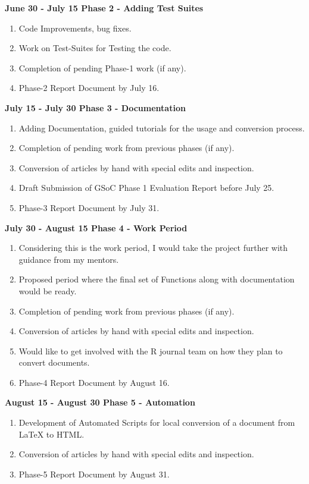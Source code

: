 \documentclass[12pt]{article}
\begin{document}
{\large\bfseries {\color{orange}June 30 - July 15} Phase 2 - Adding Test Suites}
\begin{enumerate}[label = {  \color{MediumBlue} \textbf{\arabic*. }},align=left]
\item Code Improvements, bug fixes.
\item Work on Test-Suites for Testing the code.
\item Completion of pending Phase-1 work (if any).
\item Phase-2 Report Document by July 16.
\end{enumerate}
{\large\bfseries {\color{orange}July 15 - July 30} Phase 3 - Documentation}
\begin{enumerate}[label = {  \color{MediumBlue} \textbf{\arabic*. }},align=left]
\item Adding Documentation, guided tutorials for the usage and conversion process.
\item Completion of pending work from previous phases (if any).
\item Conversion of articles by hand with special edits and inspection.
\item Draft Submission of GSoC Phase 1 Evaluation Report before July 25.
\item Phase-3 Report Document by July 31.
\end{enumerate}
{\large\bfseries {\color{orange}July 30 - August 15} Phase 4 - Work Period}
\begin{enumerate}[label = {  \color{MediumBlue} \textbf{\arabic*. }},align=left]
\item Considering this is the work period, I would take the project further with guidance from my mentors.
\item Proposed period where the final set of Functions along with documentation would be ready.
\item Completion of pending work from previous phases (if any).
\item Conversion of articles by hand with special edits and inspection.
\item Would like to get involved with the R journal team on how they plan to convert documents.
\item Phase-4 Report Document by August 16.
\end{enumerate}
{\large\bfseries {\color{orange}August 15 - August 30} Phase 5 - Automation}
\begin{enumerate}[label = {  \color{MediumBlue} \textbf{\arabic*. }},align=left]
\item Development of Automated Scripts for local conversion of a document from LaTeX to HTML.
\item Conversion of articles by hand with special edits and inspection.
\item Phase-5 Report Document by August 31.
\end{enumerate}
\end{document}
